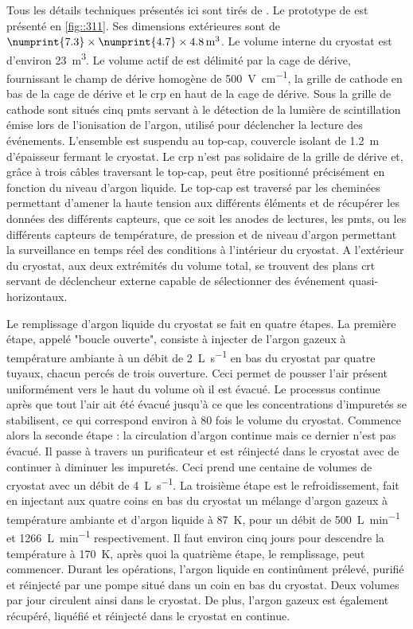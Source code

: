       Tous les détails techniques présentés ici sont tirés de \cite{Aimard2018}. Le prototype de \TOO{} est présenté en \autoref{fig::311}. Ses dimensions extérieures sont de $\numprint{7.3}\times\numprint{4.7}\times\SI{4.8}{\meter\cubed}$. Le volume interne du cryostat est d'environ \SI{23}{\meter\cubed}. Le volume actif de \TOO{} est délimité par la cage de dérive, fournissant le champ de dérive homogène de \SI{500}{\volt\per\centi\meter}, la grille de cathode en bas de la cage de dérive et le \gls{crp} en haut de la cage de dérive. Sous la grille de cathode sont situés cinq \glspl{pmt} servant à le détection de la lumière de scintillation émise lors de l'ionisation de l'argon, utilisé pour déclencher la lecture des événements. L'ensemble est suspendu au top-cap, couvercle isolant de \SI{1.2}{\meter} d'épaisseur fermant le cryostat. Le \gls{crp} n'est pas solidaire de la grille de dérive et, grâce à trois câbles traversant le top-cap, peut être positionné précisément en fonction du niveau d'argon liquide. Le top-cap est traversé par les cheminées permettant d'amener la haute tension aux différents éléments et de récupérer les données des différents capteurs, que ce soit les anodes de lectures, les \glspl{pmt}, ou les différents capteurs de température, de pression et de niveau d'argon permettant la surveillance en temps réel des conditions à l'intérieur du cryostat. A l'extérieur du cryostat, aux deux extrémités du volume total, se trouvent des plans \gls{crt} servant de déclencheur externe capable de sélectionner des événement quasi-horizontaux.

     Le remplissage d'argon liquide du cryostat se fait en quatre étapes. La première étape, appelé "boucle ouverte", consiste à injecter de l'argon gazeux à température ambiante à un débit de \SI{2}{\liter\per\second} en bas du cryostat par quatre tuyaux, chacun percés de trois ouverture. Ceci permet de pousser l'air présent uniformément vers le haut du volume où il est évacué. Le processus continue après que tout l'air ait été évacué jusqu'à ce que les concentrations d'impuretés se stabilisent, ce qui correspond environ à 80 fois le volume du cryostat. Commence alors la seconde étape : la circulation d'argon continue mais ce dernier n'est pas évacué. Il passe à travers un purificateur et est réinjecté dans le cryostat avec de continuer à diminuer les impuretés. Ceci prend une centaine de volumes de cryostat avec un débit de \SI{4}{\liter\per\second}. La troisième étape est le refroidissement, fait en injectant aux quatre coins en bas du cryostat un mélange d'argon gazeux à température ambiante et d'argon liquide à \SI{87}{\kelvin}, pour un débit de \SI{500}{\liter\per\minute} et \SI{1266}{\liter\per\minute} respectivement. Il faut environ cinq jours pour descendre la température à \SI{170}{\kelvin}, après quoi la quatrième étape, le remplissage, peut commencer. Durant les opérations, l'argon liquide en continûment prélevé, purifié et réinjecté par une pompe situé dans un coin en bas du cryostat. Deux volumes par jour circulent ainsi dans le cryostat. De plus, l'argon gazeux est également récupéré, liquéfié et réinjecté dans le cryostat en continue. 

